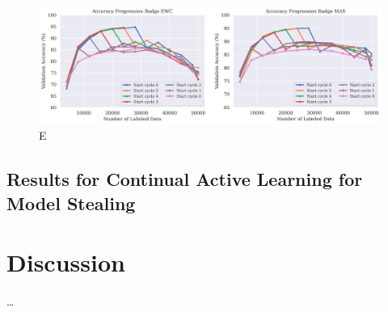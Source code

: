 \begin{figure} [ht]
    \centering
    \includegraphics[width=\linewidth]{images/results_CAL/Delayed_start_CAL.png}
    \caption[Continual Active Learning Badge 4000 batch size]{E}
    \label{fig:Evaluation:Results:CAL:DelayedStart}
\end{figure}


\subsection{Results for Continual Active Learning for Model Stealing}
\label{sec:Evaluation:Results:CALMS}


\section{Discussion}
\label{sec:Evaluation:ThirdSection}

\dots
